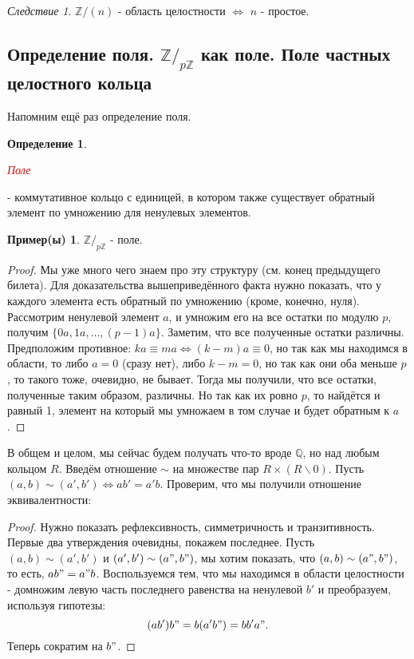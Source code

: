\documentclass[a4paper,100pt]{article}
\theoremstyle{indented}
\theoremstyle{definition}
\newtheorem{defn}{Определение}
\newtheorem{exl}{Пример(ы)}
\theoremstyle{remark}
\newtheorem{cons}{Следствие}
\begin{document}
\begin{cons}
    $\mathbb{Z}/(n)$ - область целостности $\Longleftrightarrow$ $n$ - простое.
\end{cons}

\resetall

\subsection{Определение поля. $\mathbb{Z}/_{p\mathbb{Z}}$ как поле. Поле частных целостного кольца}

Напомним ещё раз определение поля.\

\begin{defn}
    \hypertarget{n16}{\textcolor{red}{\textit{Поле}}} - коммутативное кольцо с единицей, в котором также существует обратный элемент по умножению для ненулевых элементов.
\end{defn}

\begin{exl}
    $\mathbb{Z}/_{p\mathbb{Z}}$ - поле.
\end{exl}

\begin{proof}
    Мы уже много чего знаем про эту структуру (см. конец предыдущего билета). Для доказательства вышеприведённого факта нужно показать, что у каждого элемента есть обратный по умножению (кроме, конечно, нуля). Рассмотрим ненулевой элемент $a$, и умножим его на все остатки по модулю $p$, получим $\{0a, 1a, \dots, (p-1)a\}$. Заметим, что все полученные остатки различны. Предположим противное: $ka\equiv ma \Leftrightarrow (k-m)a\equiv 0$, но так как мы находимся в области, то либо $a=0$ (сразу нет), либо $k-m=0$, но так как они оба меньше $p$, то такого тоже, очевидно, не бывает. Тогда мы получили, что все остатки, полученные таким образом, различны. Но так как их ровно $p$, то найдётся и равный 1, элемент на который мы умножаем в том случае и будет обратным к $a$.
\end{proof}

В общем и целом, мы сейчас будем получать что-то вроде $\mathbb{Q}$, но над любым кольцом $R$. Введём отношение $\sim$ на множестве пар $R\times (R\backslash 0)$. Пусть $(a, b)\sim(a', b') \Leftrightarrow ab'=a'b$. Проверим, что мы получили отношение эквивалентности:

\begin{proof}
    Нужно показать рефлексивность, симметричность и транзитивность. Первые два утверждения очевидны, покажем последнее. Пусть $(a, b)\sim(a', b')$ и $(a', b')\sim(a", b")$, мы хотим показать, что $(a, b)\sim(a", b")$, то есть, $ab"=a"b$. Воспользуемся тем, что мы находимся в области целостности - домножим левую часть последнего равенства на ненулевой $b'$ и преобразуем, используя гипотезы:
    \[
        (ab')b"=b(a'b")=bb'a".
    \]
    Теперь сократим на $b"$.
\end{proof}
\end{document}
